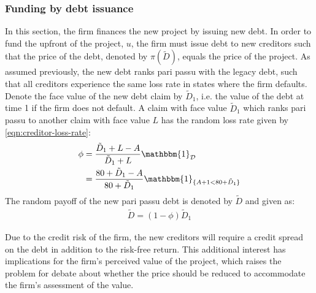 \documentclass[main.tex]{subfiles}
\begin{document}
    \subsubsection{Funding by debt issuance}
    \label{sec:example-risk-free-project-debt-issuance}
        In this section, the firm finances the new project by issuing new debt.
        In order to fund the upfront of the project, $u$, 
        the firm must issue debt to new creditors such that the price of the debt, 
        denoted by $\pi(\tilde{D})$, equals the price of the project.
        As assumed previously, the new debt ranks pari passu with the legacy debt, 
        such that all creditors experience the same loss rate in states where the firm defaults.
        Denote the face value of the new debt claim by $\tilde{D}_{1}$, 
        i.e. the value of the debt at time 1 if the firm does not default. 
        A claim with face value $\tilde{D}_{1}$ which ranks pari passu to another claim 
        with face value $L$ has the random loss rate given by \cref{eqn:creditor-loss-rate}:
            \begin{align}
                \phi
                &=
                    \frac{
                        \tilde{D}_{1} + L - A
                    }{
                        \tilde{D}_{1} + L
                    }
                    \mathbbm{1}_{\mathcal{D}}
                \nonumber \\
                &=
                    \frac{
                        \num{80} + \tilde{D}_{1} - A
                    }{
                        \num{80} + \tilde{D}_{1}
                    }
                    \mathbbm{1}_{\{A + \num{1} < \num{80} + \tilde{D}_{1}\}} 
            \end{align}
        The random payoff of the new pari passu debt is denoted by $\tilde{D}$ and given as:
            \begin{align}
                \tilde{D}
                    = (1 - \phi)\tilde{D}_{1}
            \end{align}

        Due to the credit risk of the firm, the new creditors will require a credit spread on the debt 
        in addition to the risk-free return.
        This additional interest has implications for the firm's perceived value of the project, 
        which raises the problem for debate about whether the price should be reduced 
        to accommodate the firm's assessment of the value.
\end{document}
